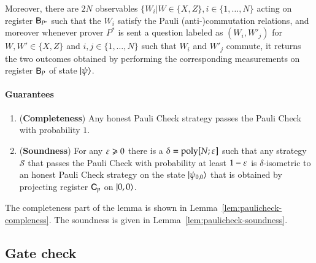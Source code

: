 Moreover, there are $2N$ observables $\{W_i|W\in\{X,Z\},i\in\{1,\ldots,N\}$ acting on register ${\textsf{B}}_{P^*}$ such that the $W_i$ satisfy the Pauli (anti-)commutation relations, and moreover whenever prover $P^*$ is sent a question labeled as $(W_i,W'_j)$ for $W,W'\in\{X,Z\}$ and $i,j\in\{1,\ldots,N\}$ such that $W_i$ and $W'_j$ commute, it returns the two outcomes obtained by performing the corresponding measurements on register ${\textsf{B}}_P$ of state $|\psi\rangle$. 



\paragraph{Guarantees}


\begin{lemma}
\label{lem:pauli_check}
\leavevmode
\begin{enumerate}
	\item (\textbf{Completeness}) Any honest Pauli Check strategy passes the Pauli Check  with probability $1$.
	\item (\textbf{Soundness}) For any $\varepsilon\geqslant 0$ there is a $\delta = \operatorname{poly}[N;\varepsilon]$ such that any strategy $\mathcal{S}$ that passes the Pauli Check with probability at least $1 - \varepsilon$ is $\delta$-isometric to an honest Pauli Check strategy on the state $|\psi_{0,0}\rangle$ that is obtained by projecting register ${\textsf{C}}_p$ on $|0,0\rangle$. 
\end{enumerate}
\end{lemma}

The completeness part of the lemma is shown in Lemma~\ref{lem:paulicheck-compleness}. The soundness is given in Lemma~\ref{lem:paulicheck-soundness}. 



\subsection{Gate check}
\label{sec:prop_check}


